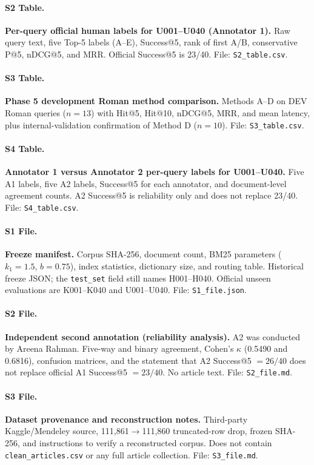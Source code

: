\documentclass[10pt,letterpaper]{article}
\begin{document}
\paragraph*{S2 Table.}
\label{S2_Table}
\textbf{Per-query official human labels for U001--U040 (Annotator 1).} Raw query text, five Top-5 labels (A--E), Success@5, rank of first A/B, conservative P@5, nDCG@5, and MRR. Official Success@5 is 23/40. File: \texttt{S2\_table.csv}.

\paragraph*{S3 Table.}
\label{S3_Table}
\textbf{Phase 5 development Roman method comparison.} Methods A--D on DEV Roman queries ($n = 13$) with Hit@5, Hit@10, nDCG@5, MRR, and mean latency, plus internal-validation confirmation of Method D ($n = 10$). File: \texttt{S3\_table.csv}.

\paragraph*{S4 Table.}
\label{S4_Table}
\textbf{Annotator 1 versus Annotator 2 per-query labels for U001--U040.} Five A1 labels, five A2 labels, Success@5 for each annotator, and document-level agreement counts. A2 Success@5 is reliability only and does not replace 23/40. File: \texttt{S4\_table.csv}.

\paragraph*{S1 File.}
\label{S1_File}
\textbf{Freeze manifest.} Corpus SHA-256, document count, BM25 parameters ($k_1 = 1.5$, $b = 0.75$), index statistics, dictionary size, and routing table. Historical freeze JSON; the \texttt{test\_set} field still names H001--H040. Official unseen evaluations are K001--K040 and U001--U040. File: \texttt{S1\_file.json}.

\paragraph*{S2 File.}
\label{S2_File}
\textbf{Independent second annotation (reliability analysis).} A2 was conducted by Areena Rahman. Five-way and binary agreement, Cohen's $\kappa$ (0.5490 and 0.6816), confusion matrices, and the statement that A2 Success@5 $= 26/40$ does not replace official A1 Success@5 $= 23/40$. No article text. File: \texttt{S2\_file.md}.

\paragraph*{S3 File.}
\label{S3_File}
\textbf{Dataset provenance and reconstruction notes.} Third-party Kaggle/Mendeley source, 111,861$\to$111,860 truncated-row drop, frozen SHA-256, and instructions to verify a reconstructed corpus. Does not contain \texttt{clean\_articles.csv} or any full article collection. File: \texttt{S3\_file.md}.
\end{document}
